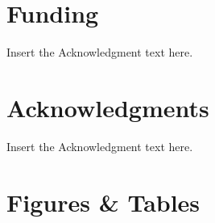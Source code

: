 \documentclass[]{rsos}%
\begin{document}
\section*{Funding}
Insert the Acknowledgment text here.

\section*{Acknowledgments}
Insert the Acknowledgment text here.




\linespread{1}\selectfont %



\pagebreak



\section*{Figures \& Tables}

\linespread{1.3}\selectfont %
\end{document}

